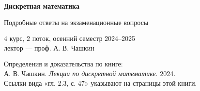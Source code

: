 \documentclass[11pt,a4paper]{article}
\begin{document}
\begin{titlepage}
\centering
\vspace*{0.3\textheight}
{\Huge\bfseries Дискретная математика\par}
\vspace{1.5em}
{\Large Подробные ответы на экзаменационные вопросы\par}
\vspace{1.5em}
{\large 4 курс, 2 поток, осенний семестр 2024–2025\\ лектор — проф. А. В. Чашкин\par}
\vspace{4em}
Определения и доказательства по книге:\\
А. В. Чашкин. \emph{Лекции по дискретной математике}. 2024.\\
Ссылки вида «гл. 2.3, с. 47» указывают на страницы этой книги.
\end{titlepage}
\tableofcontents
\end{document}
